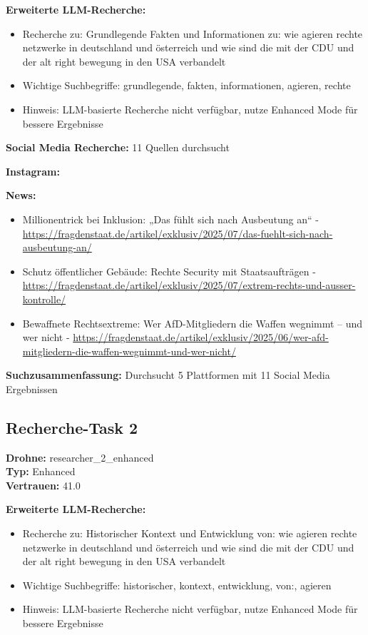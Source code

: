 \documentclass[12pt,a4paper]{article}
\begin{document}
\textbf{Erweiterte LLM-Recherche:}
\begin{itemize}
\item Recherche zu: Grundlegende Fakten und Informationen zu: wie agieren rechte netzwerke in deutschland und österreich und wie sind die mit der CDU und der alt right bewegung in den USA verbandelt
\item Wichtige Suchbegriffe: grundlegende, fakten, informationen, agieren, rechte
\item Hinweis: LLM-basierte Recherche nicht verfügbar, nutze Enhanced Mode für bessere Ergebnisse
\end{itemize}

\textbf{Social Media Recherche:} 11 Quellen durchsucht

\textbf{Instagram:}
\begin{itemize}
\end{itemize}

\textbf{News:}
\begin{itemize}
\item Millionentrick bei Inklusion: „Das fühlt sich nach Ausbeutung an“ - \url{https://fragdenstaat.de/artikel/exklusiv/2025/07/das-fuehlt-sich-nach-ausbeutung-an/}
\item Schutz öffentlicher Gebäude: Rechte Security mit Staatsaufträgen - \url{https://fragdenstaat.de/artikel/exklusiv/2025/07/extrem-rechts-und-ausser-kontrolle/}
\item Bewaffnete Rechtsextreme: Wer AfD-Mitgliedern die Waffen wegnimmt – und wer nicht - \url{https://fragdenstaat.de/artikel/exklusiv/2025/06/wer-afd-mitgliedern-die-waffen-wegnimmt-und-wer-nicht/}
\end{itemize}

\textbf{Suchzusammenfassung:} Durchsucht 5 Plattformen mit 11 Social Media Ergebnissen

\subsection{Recherche-Task 2}

\textbf{Drohne:} researcher\_2\_enhanced\\
\textbf{Typ:} Enhanced\\
\textbf{Vertrauen:} 41.0%

\textbf{Erweiterte LLM-Recherche:}
\begin{itemize}
\item Recherche zu: Historischer Kontext und Entwicklung von: wie agieren rechte netzwerke in deutschland und österreich und wie sind die mit der CDU und der alt right bewegung in den USA verbandelt
\item Wichtige Suchbegriffe: historischer, kontext, entwicklung, von:, agieren
\item Hinweis: LLM-basierte Recherche nicht verfügbar, nutze Enhanced Mode für bessere Ergebnisse
\end{itemize}
\end{document}
